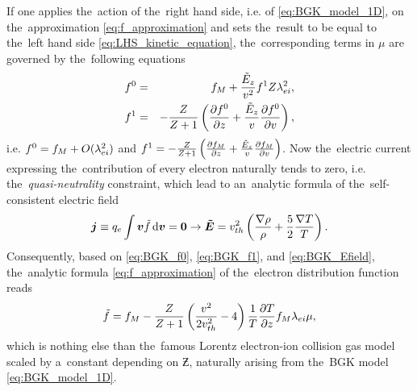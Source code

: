 If one applies the~action of the~right hand side, i.e. of 
\eqref{eq:BGK_model_1D}, 
on the~approximation \eqref{eq:f_approximation} and sets the~result to be equal 
to the~left hand side \eqref{eq:LHS_kinetic_equation}, the~corresponding terms
in $\mu$ are governed by the~following equations
\begin{eqnarray}
  f^0 &=& f_M + \frac{\tilde{E}_z}{v^2}f^1 Z\lambda_{ei}^2 ,
  \label{eq:BGK_f0} \\
  f^1 &=& - \frac{Z}{Z+1}
  \left( \frac{\partial{f^0}}{\partial{z}} + \frac{\tilde{E}_z}{v}\frac{\partial{f^0}}{\partial{v}} \right) , 
  \label{eq:BGK_f1}
\end{eqnarray}
i.e. $f^0 = f_M + O(\lambda_{ei}^2)$ and $f^1 = - \frac{Z}{Z+1}
  \left( \frac{\partial{f_M}}{\partial{z}} + \frac{\tilde{E}_z}{v}\frac{\partial{f_M}}{\partial{v}} \right)$.
Now the~electric current expressing the~contribution of every electron 
naturally tends to zero, i.e. the~\textit{quasi-neutrality} constraint, 
which lead to an~analytic formula of the~self-consistent electric field
\begin{multline}
\boldsymbol{j} \equiv q_e \int \boldsymbol{v} \tilde{f} \, \text{d}\boldsymbol{v} = \boldsymbol{0}  \rightarrow
\boldsymbol{\tilde{E}} = v_{th}^2\left(\frac{\nabla\rho}{\rho} + \frac{5}{2}\frac{\nabla T}{T} 
\right) .
\label{eq:BGK_Efield}
\end{multline}
Consequently, based on \eqref{eq:BGK_f0}, \eqref{eq:BGK_f1}, 
and \eqref{eq:BGK_Efield}, the~analytic formula \eqref{eq:f_approximation}
of the~electron distribution function reads 
\begin{equation}
  \tilde{f} = f_M - \frac{Z}{Z+1}
  \left( \frac{v^2}{2 v_{th}^2} - 4\right)
  \frac{1}{T}\frac{\partial{T}}{\partial{z}}f_M \lambda_{ei} \mu , 
  \label{eq:BGK_approximation}
\end{equation}
which is nothing else than the~famous Lorentz electron-ion collision gas model 
\cite{Lorentz_1905} scaled by a~constant depending on $\Zbar$, 
naturally arising from the~BGK model \eqref{eq:BGK_model_1D}.


